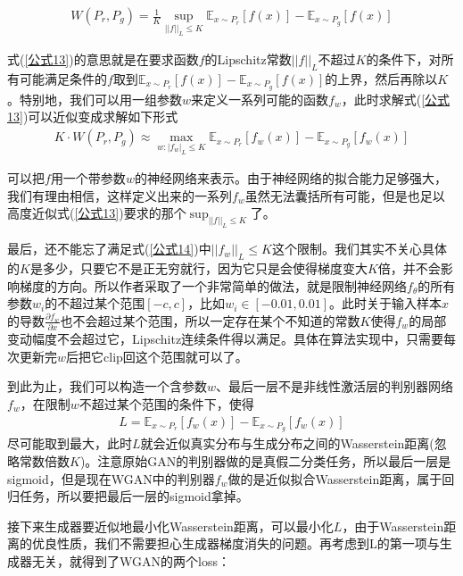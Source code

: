             \begin{align}
            \label{公式13}
            W(P_r, P_g) = \frac{1}{K} \sup_{||f||_L \leq K} \mathbb{E}_{x \sim P_r} [f(x)] - \mathbb{E}_{x \sim P_g} [f(x)]
            \end{align}
            \par
            式(\ref{公式13})的意思就是在要求函数$f$的Lipschitz常数$||f||_L$不超过$K$的条件下，对所有可能满足条件的$f$取到$\mathbb{E}_{x \sim P_r} [f(x)] - \mathbb{E}_{x \sim P_g} [f(x)]$的上界，然后再除以$K$。特别地，我们可以用一组参数$w$来定义一系列可能的函数$f_w$，此时求解式(\ref{公式13})可以近似变成求解如下形式
            \begin{align}
            \label{公式14}
            K \cdot W(P_r, P_g) \approx \max_{w: |f_w|_L \leq K} \mathbb{E}_{x \sim P_r} [f_w(x)] - \mathbb{E}_{x \sim P_g} [f_w(x)]
            \end{align}
            \par
            可以把$f$用一个带参数$w$的神经网络来表示。由于神经网络的拟合能力足够强大，我们有理由相信，这样定义出来的一系列$f_w$虽然无法囊括所有可能，但是也足以高度近似式(\ref{公式13})要求的那个$\sup_{||f||_L \leq K} $了。
            \par
            最后，还不能忘了满足式(\ref{公式14})中$||f_w||_L \leq K$这个限制。我们其实不关心具体的$K$是多少，只要它不是正无穷就行，因为它只是会使得梯度变大$K$倍，并不会影响梯度的方向。所以作者采取了一个非常简单的做法，就是限制神经网络$f_\theta$的所有参数$w_i$的不超过某个范围$[-c, c]$，比如$w_i \in [- 0.01, 0.01]$。此时关于输入样本$x$的导数$\frac{\partial f_w}{\partial x}$也不会超过某个范围，所以一定存在某个不知道的常数$K$使得$f_w$的局部变动幅度不会超过它，Lipschitz连续条件得以满足。具体在算法实现中，只需要每次更新完$w$后把它clip回这个范围就可以了。
            \par
            到此为止，我们可以构造一个含参数$w$、最后一层不是非线性激活层的判别器网络$f_w$，在限制$w$不超过某个范围的条件下，使得
            \begin{align}
            \label{公式15}
            L = \mathbb{E}_{x \sim P_r} [f_w(x)] - \mathbb{E}_{x \sim P_g} [f_w(x)]
            \end{align}
            尽可能取到最大，此时$L$就会近似真实分布与生成分布之间的Wasserstein距离(忽略常数倍数$K$)。注意原始GAN的判别器做的是真假二分类任务，所以最后一层是sigmoid，但是现在WGAN中的判别器$f_w$做的是近似拟合Wasserstein距离，属于回归任务，所以要把最后一层的sigmoid拿掉。
            \par
            接下来生成器要近似地最小化Wasserstein距离，可以最小化$L$，由于Wasserstein距离的优良性质，我们不需要担心生成器梯度消失的问题。再考虑到L的第一项与生成器无关，就得到了WGAN的两个loss：
